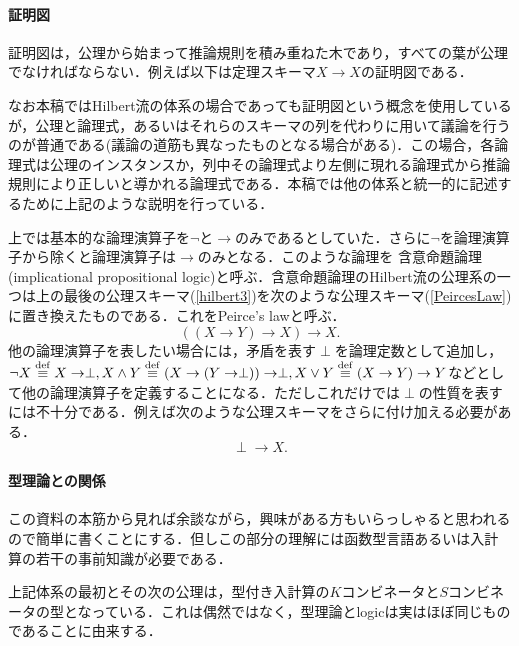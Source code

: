 \documentclass{ltjsarticle}
\theoremstyle{mystyle1}
\theoremstyle{mystyle3}
\theoremstyle{mystyle2}
\newcommand{\dequiv}{\ensuremath{\stackrel{\rm{def}}{\equiv}}}
\newcommand{\red}[1]{{\color{red} #1}}
\begin{document}
\paragraph{証明図}
証明図は，公理から始まって推論規則を積み重ねた木であり，すべての葉が公理でなければならない．例えば以下は定理スキーマ$X\to X$の証明図である．
\begin{prooftree}
\end{prooftree}
なお本稿ではHilbert流の体系の場合であっても証明図という概念を使用しているが，公理と論理式，あるいはそれらのスキーマの列を代わりに用いて議論を行うのが普通である(議論の道筋も異なったものとなる場合がある)．この場合，各論理式は公理のインスタンスか，列中その論理式より左側に現れる論理式から推論規則により正しいと導かれる論理式である．本稿では他の体系と統一的に記述するために上記のような説明を行っている．

上では基本的な論理演算子を$\neg$と$\to$のみであるとしていた．さらに$\neg$を論理演算子から除くと論理演算子は$\to$のみとなる．このような論理を\red{含意命題論理}(implicational propositional logic)と呼ぶ．含意命題論理のHilbert流の公理系の一つは上の最後の公理スキーマ(\ref{hilbert3})を次のような公理スキーマ(\ref{PeircesLaw})に置き換えたものである．これをPeirce's lawと呼ぶ．
\begin{equation}
  \left(\left(X\to Y\right)\to X\right)\to X.\label{PeircesLaw}
\end{equation}
他の論理演算子を表したい場合には，矛盾を表す$\perp$を論理定数として追加し，$\neg X\dequiv X\to\perp, X\wedge Y\dequiv\left(X\to \left(Y\to\perp\right)\right) \to\perp,X\vee Y\dequiv\left(X\to Y\right)\to Y$などとして他の論理演算子を定義することになる．ただしこれだけでは$\perp$の性質を表すには不十分である．例えば次のような公理スキーマをさらに付け加える必要がある．
\begin{equation}
  \perp\to X.\label{perpToX}
\end{equation}
\paragraph{型理論との関係}
この資料の本筋から見れば余談ながら，興味がある方もいらっしゃると思われるので簡単に書くことにする．但しこの部分の理解には函数型言語あるいは入計算の若干の事前知識が必要である．

上記体系の最初とその次の公理は，型付き入計算の$K$コンビネータと$S$コンビネータの型となっている．これは偶然ではなく，型理論とlogicは実はほぼ同じものであることに由来する．
\end{document}
